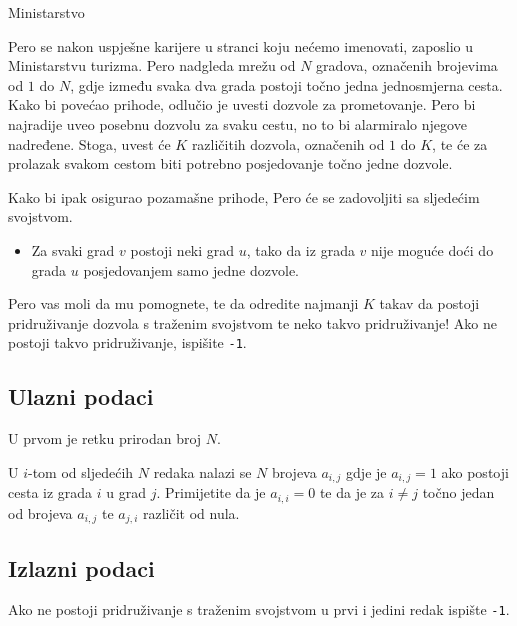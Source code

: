 \begin{statement}[
  problempoints=100,
  timelimit=1 sekunda,
  memorylimit=1024 MiB,
]{Ministarstvo}

Pero se nakon uspješne karijere u stranci koju nećemo imenovati, zaposlio u Ministarstvu turizma. Pero nadgleda mrežu od $N$ gradova, označenih brojevima od $1$ do $N$, gdje između svaka dva grada postoji točno jedna jednosmjerna cesta. Kako bi povećao prihode, odlučio je uvesti dozvole za prometovanje. Pero bi najradije uveo posebnu dozvolu za svaku cestu, no to bi alarmiralo njegove nadređene. Stoga, uvest će $K$ različitih dozvola, označenih od $1$ do $K$, te će za prolazak svakom cestom biti potrebno posjedovanje točno jedne dozvole. 

Kako bi ipak osigurao pozamašne prihode, Pero će se zadovoljiti sa sljedećim svojstvom.

\begin{itemize}
\item Za svaki grad $v$ postoji neki grad $u$, tako da iz grada $v$ nije moguće doći do grada $u$ posjedovanjem samo jedne dozvole.
\end{itemize} 

Pero vas moli da mu pomognete, te da odredite najmanji $K$ takav da postoji pridruživanje dozvola s traženim svojstvom te neko takvo pridruživanje! Ako ne postoji takvo pridruživanje, ispišite \texttt{-1}. 

\subsection*{Ulazni podaci}

U prvom je retku prirodan broj $N$.

U $i$-tom od sljedećih $N$ redaka nalazi se $N$ brojeva $a_{i, j}$ gdje je $a_{i, j} = 1$ ako postoji cesta iz grada $i$ u grad $j$. Primijetite da je $a_{i, i} = 0$ te da je za $i \neq j$ točno jedan od brojeva $a_{i, j}$ te $a_{j, i}$ različit od nula. 

\subsection*{Izlazni podaci}

Ako ne postoji pridruživanje s traženim svojstvom u prvi i jedini redak ispište \texttt{-1}.


\end{statement}
